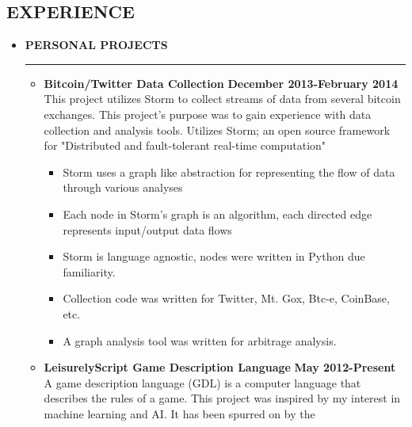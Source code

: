 \documentclass[overlapped]{res}
\begin{document}
\begin{resume}
\section{EXPERIENCE}
\vspace{0.125in}
\begin{itemize}[leftmargin=0in]
    \item[] \textbf{PERSONAL PROJECTS} \\[-0.1in] \rule{\textwidth}{0.5pt}
        \begin{itemize}[leftmargin=0in]
            \item[] 
                \begin{samepage}
                    \textbf{Bitcoin/Twitter Data Collection} \hfill \textbf{December 2013-February 2014} \\
                    This project utilizes Storm to collect streams of data from several bitcoin exchanges. This 
                    project's purpose was to gain experience with data collection and analysis tools. Utilizes 
                    Storm; an open source framework for "Distributed and fault-tolerant real-time computation"
                    \begin{itemize}
                        \item[\textbullet] Storm uses a graph like abstraction for representing the flow of data through various analyses
                        \item[\textbullet] Each node in Storm's graph is an algorithm, each directed edge represents input/output data flows
                        \item[\textbullet] Storm is language agnostic, nodes were written in Python due familiarity.
                        \item[\textbullet] Collection code was written for Twitter, Mt. Gox, Btc-e, CoinBase, etc.
                        \item[\textbullet] A graph analysis tool was written for arbitrage analysis.
                    \end{itemize}
                \end{samepage}
            \item[] 
                \begin{samepage}
                    \textbf{LeisurelyScript Game Description Language} \hfill \textbf{May 2012-Present} \\
                    A game description language (GDL) is a computer language that describes the rules of a game. 
                    This project was inspired by my interest in machine learning and AI. It has been spurred on by the 

\end{samepage}
\end{itemize}
\end{itemize}
\end{resume}
\end{document}

